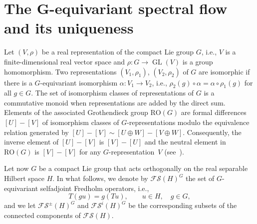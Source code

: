 \documentclass[pdftex]{sigma}
\numberwithin{equation}{section}
\theoremstyle{definition}
\DeclareMathOperator{\GL}{GL}
\begin{document}
\section{The \texorpdfstring{$\boldsymbol{G}$}{G}-equivariant spectral flow and its uniqueness}\label{sect-gequivsfl}

Let $(V,\rho)$ be a real representation of the compact Lie group $G$, i.e., $V$ is a finite-dimensional real vector space and $\rho \colon G\rightarrow\GL(V)$ is a group homomorphism. Two representations $(V_1,\rho_1)$, $(V_2,\rho_2)$ of $G$ are isomorphic if there is a $G$-equivariant isomorphism $\alpha \colon V_1\rightarrow V_2$, i.e., $\rho_2(g)\circ \alpha=\alpha\circ\rho_1(g)$ for all $g\in G$. The set of isomorphism classes of representations of $G$ is a commutative monoid when representations are added by the direct sum. Elements of the associated Grothendieck group $\mathrm{RO}(G)$ are formal differences $[U]-[V]$ of isomorphism classes of $G$-representations modulo the equivalence relation generated by $[U]-[V]\sim [U\oplus W]-[V\oplus W]$. Consequently, the inverse element of $[U]-[V]$ is $[V]-[U]$ and the neutral element in $\mathrm{RO}(G)$ is $[V]-[V]$ for any $G$-representation~$V$ (see~\cite{Segal}).

Let now $G$ be a compact Lie group that acts orthogonally on the real separable Hilbert space $H$. In what follows, we denote by $\mathcal{FS}(H)^G$ the set of $G$-equivariant selfadjoint Fredholm operators, i.e.,
\[T(gu)=g(T u),\qquad u\in H,\quad g\in G,\]
and we let $\mathcal{FS}^\pm(H)^G$ and $\mathcal{FS}^i(H)^G$ be the corresponding subsets of the connected components of $\mathcal{FS}(H)$.
\end{document}
